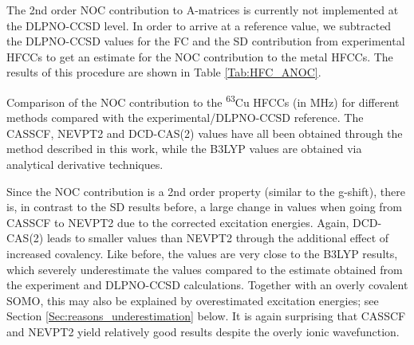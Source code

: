 The 2nd order NOC contribution to A-matrices is currently not implemented at the DLPNO-CCSD level. In order to arrive at a reference value, we subtracted the DLPNO-CCSD values for the FC and the SD contribution from experimental HFCCs to get an estimate for the NOC contribution to the metal HFCCs. The results of this procedure are shown in Table \ref{Tab:HFC_ANOC}.
\begin{table}
\small
\centering
\ttabbox
{\caption[NOC contribution to the \textsuperscript{63}Cu HFCCs.]{Comparison of the NOC contribution to the \textsuperscript{63}Cu HFCCs (in MHz) for different methods compared with the experimental/DLPNO-CCSD reference. The CASSCF, NEVPT2 and DCD-CAS(2) values have all been obtained through the method described in this work, while the B3LYP values are obtained via analytical derivative techniques.}
\label{Tab:HFC_ANOC}}
{
}
\end{table}

Since the NOC contribution is a 2nd order property (similar to the g-shift), there is, in contrast to the SD results before, a large change in values when going from CASSCF to NEVPT2 due to the corrected excitation energies. Again, DCD-CAS(2) leads to smaller values than NEVPT2 through the additional effect of increased covalency. Like before, the values are very close to the B3LYP results, which severely underestimate the values compared to the estimate obtained from the experiment and DLPNO-CCSD calculations. Together with an overly covalent SOMO, this may also be explained by overestimated excitation energies; see Section \ref{Sec:reasons_underestimation} below. It is again surprising that CASSCF and NEVPT2 yield relatively good results despite the overly ionic wavefunction.

